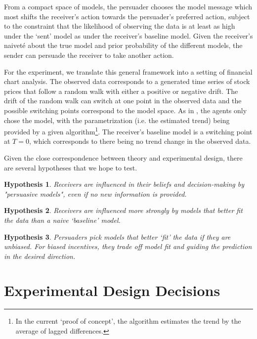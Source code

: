 \documentclass[11pt, a4paper, leqno]{article}
\newtheorem{hypothesis}{Hypothesis}
\begin{document}
From a compact space of models, the persuader chooses the model message which most shifts the receiver's action towards the persuader's preferred action, subject to the constraint that the likelihood of observing the data is at least as high under the `sent' model as under the receiver's baseline model. Given the receiver's naiveté about the true model and prior probability of the different models, the sender can persuade the receiver to take another action.

For the experiment, we translate this general framework into a setting of financial chart analysis. The observed data corresponds to a generated time series of stock prices that follow a random walk with either a positive or negative drift. The drift of the random walk can switch at one point in the observed data and the possible switching points correspond to the model space. As in \cite{Schwartzstein}, the agents only chose the model, with the parametrization (i.e. the estimated trend)  being provided by a given algorithm\footnote{In the current `proof of concept', the algorithm estimates the trend by the average of lagged differences.}. The receiver's baseline model is a switching point at $T=0$, which corresponds to there being no trend change in the observed data.

Given the close correspondence between theory and experimental design, there are several hypotheses that we hope to test.




\begin{hypothesis}
Receivers are influenced in their beliefs and decision-making by "persuasive models", even if no new information is provided.
\end{hypothesis}

\begin{hypothesis}
Receivers are influenced more strongly by models that better fit the data than a naive `baseline' model. 
\end{hypothesis}

\begin{hypothesis}
Persuaders pick models that better `fit' the data if they are unbiased. For biased incentives, they trade off model fit and guiding the prediction in the desired direction.
\end{hypothesis}




\section{Experimental Design Decisions}
\end{document}
